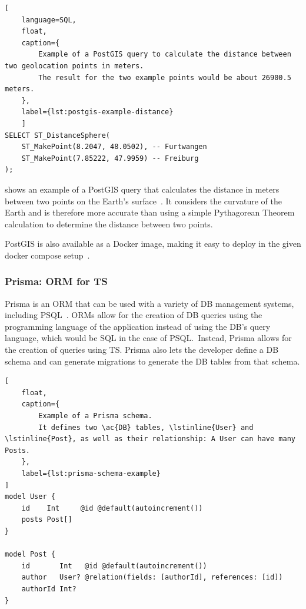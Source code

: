 \begin{lstlisting}[
    language=SQL,
    float,
    caption={
        Example of a PostGIS query to calculate the distance between two geolocation points in meters.
        The result for the two example points would be about 26900.5 meters.
    },
    label={lst:postgis-example-distance}
    ]
SELECT ST_DistanceSphere(
    ST_MakePoint(8.2047, 48.0502), -- Furtwangen
    ST_MakePoint(7.85222, 47.9959) -- Freiburg
);
\end{lstlisting}

 shows an example of a PostGIS query that calculates the distance in meters between two points on the Earth's surface~\cite{postgis_psc__osgeo_st_distancesphere_nodate}.
It considers the curvature of the Earth and is therefore more accurate than using a simple Pythagorean Theorem calculation to determine the distance between two points.

PostGIS is also available as a Docker image, making it easy to deploy in the given docker compose setup~\cite{docker_inc_postgispostgis_2023}.

\subsubsection{Prisma: \acl{ORM} for \acl{TS}}

Prisma is an \ac{ORM} that can be used with a variety of \ac{DB} management systems, including \ac{PSQL}~\cite{prisma_data_inc_prisma_2023}.
\acp{ORM} allow for the creation of \ac{DB} queries using the programming language of the application instead of using the \ac{DB}'s query language, which would be \ac{SQL} in the case of \ac{PSQL}.\
Instead, Prisma allows for the creation of queries using \ac{TS}.
Prisma also lets the developer define a \ac{DB} schema and can generate migrations to generate the \ac{DB} tables from that schema.

\begin{lstlisting}[
    float,
    caption={
        Example of a Prisma schema.
        It defines two \ac{DB} tables, \lstinline{User} and \lstinline{Post}, as well as their relationship: A User can have many Posts.
    },
    label={lst:prisma-schema-example}
]
model User {
    id    Int     @id @default(autoincrement())
    posts Post[]
}
    
model Post {
    id       Int   @id @default(autoincrement())
    author   User? @relation(fields: [authorId], references: [id])
    authorId Int?
}
\end{lstlisting}

